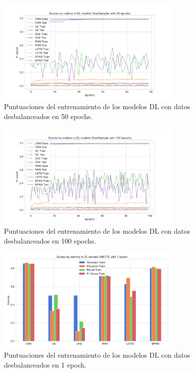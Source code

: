 \begin{figure}[h!]
	\centering
	\includegraphics[width=0.8\textwidth]{"figuras/Experimento5/OverSampler/DL_OverSampler_50_train"}
	\caption{Puntuaciones del entrenamiento de los modelos DL con datos desbalanceados en 50 epochs.}
	\label{an:17}
\end{figure}

\begin{figure}[h!]
	\centering
	\includegraphics[width=0.8\textwidth]{"figuras/Experimento5/OverSampler/DL_OverSampler_100_train"}
	\caption{Puntuaciones del entrenamiento de los modelos DL con datos desbalanceados en 100 epochs.}
	\label{an:18}
\end{figure}

\begin{figure}[h!]
	\centering
	\includegraphics[width=0.8\textwidth]{"figuras/Experimento5/SMOTE/DL_SMOTE_1_train"}
	\caption{Puntuaciones del entrenamiento de los modelos DL con datos desbalanceados en 1 epoch.}
	\label{an:19}
\end{figure}

